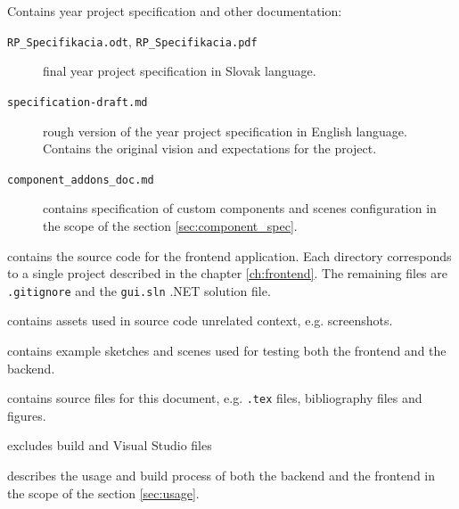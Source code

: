 \documentclass[12pt,a4paper]{report}
\begin{document}
\begin{description}
\begin{description}
		\end{description}
	\item[\texttt{docs/}] Contains year project specification and other documentation:
		\begin{description}
			\item[\texttt{RP\_Specifikacia.odt}, \texttt{RP\_Specifikacia.pdf}] final year project specification in Slovak language.
			\item[\texttt{specification-draft.md}] rough version of the year project specification in English language. Contains the original vision and expectations for the project.
			\item[\texttt{component\_addons\_doc.md}] contains specification of custom components and scenes configuration in the scope of the section \ref{sec:component_spec}.
		\end{description}
	\item[\texttt{frontend/}] contains the source code for the frontend application. Each directory corresponds to a single project described in the chapter \ref{ch:frontend}. The remaining files are \texttt{.gitignore} and the \texttt{gui.sln} .NET solution file.
	\item[\texttt{res/}] contains assets used in source code unrelated context, e.g. screenshots.
	\item[\texttt{tests/}] contains example sketches and scenes used for testing both the frontend and the backend.
	\item[\texttt{thesis/}] contains source files for this document, e.g. \texttt{.tex} files, bibliography files and figures.
	\item[\texttt{.gitignore}] excludes build and Visual Studio files
	\item[\texttt{README.md}] describes the usage and build process of both the backend and the frontend in the scope of the section \ref{sec:usage}.
\end{description}
\end{document}
